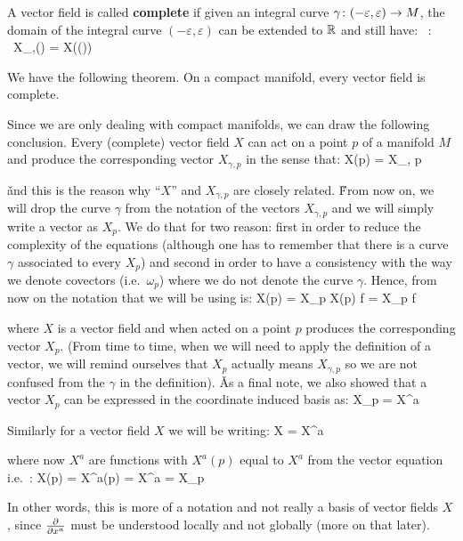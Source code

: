 A vector field is called \textbf{complete} if given an integral curve $\gamma\colon(-\varepsilon,\varepsilon)\to M$, the
domain of the integral curve $(-\varepsilon,\varepsilon)$ can be extended to $\mathbb{R}$ and still have:
\bse
\forall \, \lambda \in \R : \ X_{\gamma,\gamma(\lambda)} = X(\gamma(\lambda))
\ese
\ed

We have the following theorem.
\bt[]
On a compact manifold, every vector field is complete.
\et

Since we are only dealing with compact manifolds, we can draw the following conclusion. Every (complete) vector field
$X$ can act on a point $p$ of a manifold $M$ and produce the corresponding vector $X_{\gamma, p}$ in the sense that:
\bse
X(p) = X_{\gamma, p}
\ese

\v

and this is the reason why ``$X$'' and $X_{\gamma, p}$ are closely related. \v

From now on, we will drop the curve $\gamma$ from the notation of the vectors $X_{\gamma, p}$ and we will simply
write a vector as $X_p$. We do that for two reason: first in order to reduce the complexity of the equations
(although one has to remember that there is a curve $\gamma$ associated to every $X_p$) and second in order to have a
consistency with the way we denote covectors (i.e.\ $\omega_p$) where we do not denote the curve $\gamma$. Hence, from
now on the notation that we will be using is:
\bse
X(p) = X_p \implies X(p) f = X_p f
\ese

where $X$ is a vector field and when acted on a point $p$ produces the corresponding vector $X_p$. (From time to
time, when we will need to apply the definition of a vector, we will remind ourselves that $X_p$ actually means
$X_{\gamma, p}$ so we are not confused from the $\gamma$ in the definition). \v

As a final note, we also showed that a vector $X_p$ can be expressed in the coordinate induced basis as:
\bse
X_{p} = X^a 
\ese

Similarly for a vector field $X$ we will be writing:
\bse
X = X^a 
\ese

where now $X^a$ are functions with $X^a(p)$ equal to $X^a$ from the vector equation i.e.\ :
\bse
X(p) = X^a(p)  = X^a  = X_p
\ese

In other words, this is more of a notation and not really a basis of vector fields $X$, since $\frac{\partial }{\partial x^a}$ must be
understood locally and not globally (more on that later).

